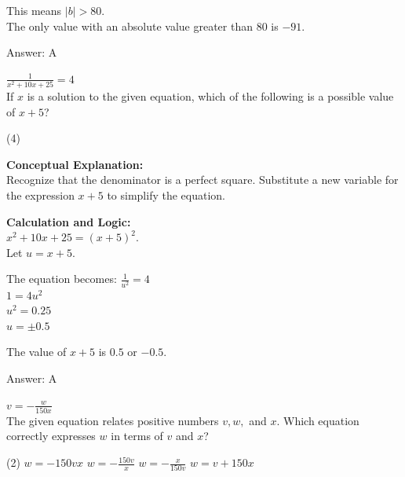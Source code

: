 \documentclass[11pt,paper=a4,answers]{exam}
\begin{document}
\begin{questions}
\begin{solution}
\vspace{10pt}

This means $|b| > 80$. \\
The only value with an absolute value greater than 80 is $-91$.

\vspace{25pt}

Answer: \colorbox{yellow!100}{A}
\end{solution}

\vspace{40pt}

\question
$\frac{1}{x^2 + 10x + 25} = 4$ \\
If $x$ is a solution to the given equation, which of the following is a possible value of $x + 5$?
\begin{tasks}(4)
\end{tasks}

\begin{solution}
\textbf{Conceptual Explanation:} \\
Recognize that the denominator is a perfect square. Substitute a new variable for the expression $x+5$ to simplify the equation.

\vspace{20pt}

\textbf{Calculation and Logic:} \\
$x^2 + 10x + 25 = (x + 5)^2$. \\
Let $u = x + 5$.

\vspace{10pt}

The equation becomes: $\frac{1}{u^2} = 4$ \\
$1 = 4u^2$ \\
$u^2 = 0.25$ \\
$u = \pm 0.5$

\vspace{10pt}

The value of $x+5$ is $0.5$ or $-0.5$.

\vspace{25pt}

Answer: \colorbox{yellow!100}{A}
\end{solution}

\vspace{40pt}

\question
$v = -\frac{w}{150x}$ \\
The given equation relates positive numbers $v, w,$ and $x$. Which equation correctly expresses $w$ in terms of $v$ and $x$?
\begin{tasks}(2)
    \task $w = -150vx$
    \task $w = -\frac{150v}{x}$
    \task $w = -\frac{x}{150v}$
    \task $w = v + 150x$
\end{tasks}


\end{questions}
\end{document}

